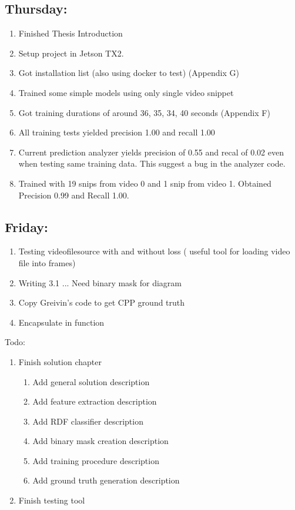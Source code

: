 \documentclass[12pt,oneside]{book}
\begin{document}
  \subsection*{Thursday:}
  \begin{enumerate}
    \item Finished Thesis Introduction
    \item Setup project in Jetson TX2.
    \item Got installation list (also using docker to test) (Appendix G)
    \item Trained some simple models using only single video snippet
    \item Got training durations of around 36, 35, 34, 40 seconds (Appendix F)
    \item All training tests yielded precision 1.00 and recall 1.00
    \item Current prediction analyzer yields precision of 0.55 and recal of 0.02 even when testing same training data. This suggest a bug in the analyzer code.
    \item Trained with 19 snips from video 0 and 1 snip from video 1. Obtained Precision 0.99 and Recall 1.00.
  \end{enumerate}

  \subsection*{Friday:}

  \begin{enumerate}
    \item Testing videofilesource with and without loss (
      useful tool for loading video file into frames)
    \item Writing 3.1 ... Need binary mask for diagram
    \item Copy Greivin's code to get CPP ground truth
    \item Encapsulate in function
  \end{enumerate}

  Todo:
  \begin{enumerate}
    \item Finish solution chapter
    \begin{enumerate}
      \item Add general solution description
      \item Add feature extraction description
      \item Add RDF classifier description
      \item Add binary mask creation description
      \item Add training procedure description
      \item Add ground truth generation description
    \end{enumerate}
    \item Finish testing tool
  \end{enumerate}
\end{document}
